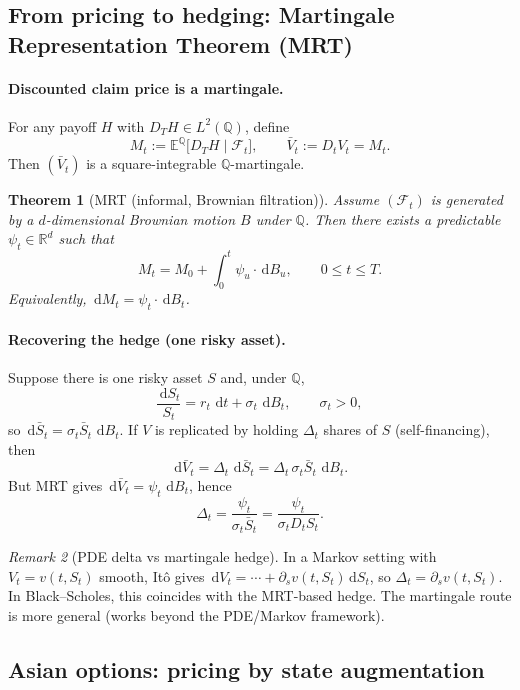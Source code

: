 \documentclass[11pt]{article}
\newcommand{\R}{\mathbb{R}}
\newcommand{\F}{\mathcal{F}}
\newcommand{\Qbb}{\mathbb{Q}}
\newcommand{\E}{\mathbb{E}}
\newcommand{\dd}{\,\mathrm{d}}
\newcommand{\1}{\mathbf{1}}
\theoremstyle{plain}
\newtheorem{theorem}{Theorem}[section]
\theoremstyle{definition}
\theoremstyle{remark}
\newtheorem{remark}[theorem]{Remark}
\begin{document}
\subsection{From pricing to hedging: Martingale Representation Theorem (MRT)}

\paragraph{Discounted claim price is a martingale.}
For any payoff $H$ with $D_T H\in L^2(\Qbb)$, define
\[
M_t:=\E^{\Qbb}\!\big[D_T H\mid \F_t\big],
\qquad
\bar V_t:=D_t V_t = M_t.
\]
Then $(\bar V_t)$ is a square-integrable $\Qbb$-martingale.

\begin{theorem}[MRT (informal, Brownian filtration)]
Assume $(\F_t)$ is generated by a $d$-dimensional Brownian motion $B$ under $\Qbb$.
Then there exists a predictable $\psi_t\in\R^d$ such that
\[
\boxed{\ M_t = M_0+\int_0^t \psi_u\cdot \dd B_u,\qquad 0\le t\le T.\ }
\]
Equivalently, $\dd M_t=\psi_t\cdot \dd B_t$.
\end{theorem}

\paragraph{Recovering the hedge (one risky asset).}
Suppose there is one risky asset $S$ and, under $\Qbb$,
\[
\frac{\dd S_t}{S_t}=r_t\,\dd t+\sigma_t\,\dd B_t,
\qquad \sigma_t>0,
\]
so $\dd\bar S_t=\sigma_t \bar S_t\,\dd B_t$.
If $V$ is replicated by holding $\Delta_t$ shares of $S$ (self-financing), then
\[
\dd\bar V_t = \Delta_t\,\dd\bar S_t = \Delta_t\,\sigma_t \bar S_t\,\dd B_t.
\]
But MRT gives $\dd\bar V_t=\psi_t\,\dd B_t$, hence
\[
\boxed{\ \Delta_t=\frac{\psi_t}{\sigma_t \bar S_t}=\frac{\psi_t}{\sigma_t D_t S_t}. \ }
\]

\begin{remark}[PDE delta vs martingale hedge]
In a Markov setting with $V_t=v(t,S_t)$ smooth, It\^o gives $\dd V_t=\cdots + \partial_s v(t,S_t)\dd S_t$,
so $\Delta_t=\partial_s v(t,S_t)$. In Black--Scholes, this coincides with the MRT-based hedge.
The martingale route is more general (works beyond the PDE/Markov framework).
\end{remark}

\subsection{Asian options: pricing by state augmentation}
\end{document}
